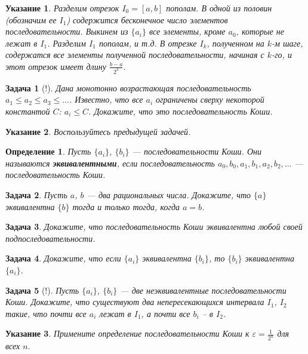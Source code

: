 \documentclass[12pt]{book}
\renewcommand{\epsilon}{\varepsilon}
\theoremstyle{upshape}
\newtheorem{zadacha}{Задача}[chapter]
\theoremstyle{generic}
\newtheorem{opredelenie}[teorema]{Определение}
\theoremstyle{upshapenonumber}
\newtheorem{ukazanie}{Указание}[section]
\newcommand{\следствие}{%
     \refstepcounter{teorema}
     {\noindent\bf Следствие \thechapter.\arabic{teorema}:\ }}
\newcommand{\пример}{%
     \refstepcounter{teorema}
     {\noindent\bf Пример \thechapter.\arabic{teorema}:\ }}
\newcommand{\лемма}{%
     \refstepcounter{teorema}
     {\noindent\bf Лемма \thechapter.\arabic{teorema}:\ }}
\newcommand{\теорема}{%
     \refstepcounter{teorema}
     {\noindent\bf Теорема \thechapter.\arabic{teorema}:\ }}
\newcommand{\утверждение}{%
     \refstepcounter{teorema}
     {\noindent\bf Утверждение \thechapter.\arabic{teorema}:\ }}
\begin{document}
\begin{ukazanie} Разделим отрезок $I_0=[a, b]$ пополам.
В одной из половин (обозначим ее $I_1$) содержится бесконечное число
элементов последовательности. Выкинем из $\{a_i\}$ все элементы,
кроме $a_0$, которые не лежат в $I_1$. Разделим $I_1$ пополам, и
т.д. В отрезке $I_k$, полученном на $k$-м шаге, содержатся все
элементы полученной последовательности, начиная с $k$-го, и этот
отрезок имеет длину $\frac{b-a}{2^k}$.
\end{ukazanie}

\begin{zadacha}[!] Дана монотонно возрастающая последовательность 
$a_1\leq a_2 \leq a_3 \leq\dots$. Известно, что все $a_i$ ограничены
сверху некоторой константой $C$: $a_i \leq C$. Докажите, что это
последовательность Коши.
\end{zadacha}

\begin{ukazanie} Воспользуйтесь предыдущей задачей.
\end{ukazanie}

\begin{opredelenie} Пусть $\{ a_i\}$, $\{b_i\}$ --- последовательности
Коши. Они называются {\bf эквивалентными}, если последовательность
$a_0, b_0, a_1, b_1, a_2, b_2, ... $ --- последовательность Коши.
\end{opredelenie}

\begin{zadacha}
Пусть $a$, $b$ --- два рациональных числа. Докажите, что $\{a\}$
эквивалентна $\{b\}$ тогда и только тогда, когда $a=b$.
\end{zadacha}

\begin{zadacha} Докажите, что последовательность
Коши эквивалентна любой своей подпоследовательности.
\end{zadacha}

\begin{zadacha}
Докажите, что если $\{a_i\}$ эквивалентна $\{b_i\}$, то $\{b_i\}$
эквивалентна $\{a_i\}$.
\end{zadacha}

\begin{zadacha}[!]\label{otdeleny}
Пусть $\{a_i\}$, $\{b_i\}$ --- две неэквивалентные последовательности
Коши. Докажите, что существуют два непересекающихся интервала $I_1$,
$I_2$ такие, что почти все $a_i$ лежат в $I_1$, а почти все $b_i$ --
в $I_2$.
\end{zadacha}

\begin{ukazanie} Примените определение последовательности Коши к
$\epsilon = \frac{1}{2^n}$ для всех $n$.
\end{ukazanie}
\end{document}

